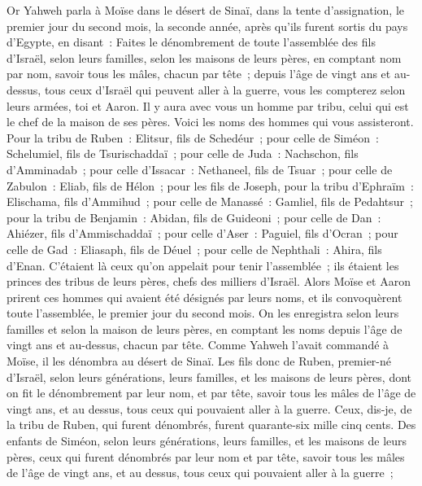 \begin{multicols}{2}
\VerseOne{}Or Yahweh parla à Moïse dans le désert de Sinaï, dans la tente d'assignation, le premier jour du second mois, la seconde année, après qu'ils furent sortis du pays d'Egypte, en disant~:
Faites le dénombrement de toute l'assemblée des fils d'Israël, selon leurs familles, selon les maisons de leurs pères, en comptant nom par nom, savoir tous les mâles, chacun par tête~;
depuis l'âge de vingt ans et au-dessus, tous ceux d'Israël qui peuvent aller à la guerre, vous les compterez selon leurs armées, toi et Aaron.
Il y aura avec vous un homme par tribu, celui qui est le chef de la maison de ses pères.
Voici les noms des hommes qui vous assisteront. Pour la tribu de Ruben~: Elitsur, fils de Schedéur~;
pour celle de Siméon~: Schelumiel, fils de Tsurischaddaï~;
pour celle de Juda~: Nachschon, fils d'Amminadab~;
pour celle d'Issacar~: Nethaneel, fils de Tsuar~;
pour celle de Zabulon~: Eliab, fils de Hélon~;
pour les fils de Joseph, pour la tribu d'Ephraïm~: Elischama, fils d'Ammihud~; pour celle de Manassé~: Gamliel, fils de Pedahtsur~;
pour la tribu de Benjamin~: Abidan, fils de Guideoni~;
pour celle de Dan~: Ahiézer, fils d'Ammischaddaï~;
pour celle d'Aser~: Paguiel, fils d'Ocran~;
pour celle de Gad~: Eliasaph, fils de Déuel~;
pour celle de Nephthali~: Ahira, fils d'Enan.
C'étaient là ceux qu'on appelait pour tenir l'assemblée~; ils étaient les princes des tribus de leurs pères, chefs des milliers d'Israël.
Alors Moïse et Aaron prirent ces hommes qui avaient été désignés par leurs noms,
et ils convoquèrent toute l'assemblée, le premier jour du second mois. On les enregistra selon leurs familles et selon la maison de leurs pères, en comptant les noms depuis l'âge de vingt ans et au-dessus, chacun par tête.
Comme Yahweh l'avait commandé à Moïse, il les dénombra au désert de Sinaï.
Les fils donc de Ruben, premier-né d'Israël, selon leurs générations, leurs familles, et les maisons de leurs pères, dont on fit le dénombrement par leur nom, et par tête, savoir tous les mâles de l'âge de vingt ans, et au dessus, tous ceux qui pouvaient aller à la guerre.
Ceux, dis-je, de la tribu de Ruben, qui furent dénombrés, furent quarante-six mille cinq cents.
Des enfants de Siméon, selon leurs générations, leurs familles, et les maisons de leurs pères, ceux qui furent dénombrés par leur nom et par tête, savoir tous les mâles de l'âge de vingt ans, et au dessus, tous ceux qui pouvaient aller à la guerre~;

\end{multicols}
